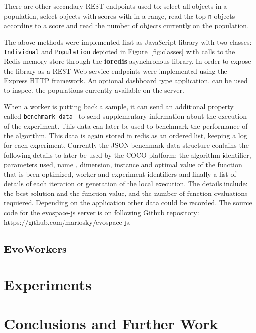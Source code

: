 There are other secondary REST endpoints used to: select all objects in a 
population, select objects with scores with in a range, read the 
top {\tt n} objects according to a score and read the number of
objects currently on the population.      

The above methods were implemented first as JavaScript library 
with two classes: {\tt Individual} and {\tt Population} depicted 
in Figure~\ref{fig:classes} with calls to the Redis memory store 
through the {\bf ioredis} 
asynchronous library. In order to expose the library as a 
REST Web service endpoints were implemented using the Express HTTP framework. 
An optional dashboard type application, can be used to inspect 
the populations currently available on the server.


When a worker is putting back a sample, it can send 
an additional property called {\tt benchmark_data }
to send supplementary information about the execution 
of the experiment.  This data can later be used to 
benchmark the performance of the algorithm. This 
data is again stored in redis as an ordered list, 
keeping a log for each experiment. Currently the JSON 
benchmark data structure contains the following details 
to later be used by the COCO platform: the algorithm identifier, 
parameters used, name , dimension, instance and optimal value 
of the function that is been optimized, worker and experiment 
identifiers and finally a list of details of each iteration 
or generation of the local execution. The details include:
the best solution and the function value, and the number of
function evaluations requiered. Depending on the application
other data could be recorded. The source code for the evospace-js
server is on following Github repository: 
https://github.com/mariosky/evospace-js.


\subsection{EvoWorkers}
\label{sec:evoworkers}


\section{Experiments}
 \label{sec:experiments}



\section{Conclusions and Further Work}
\label{sec:conclusions}

